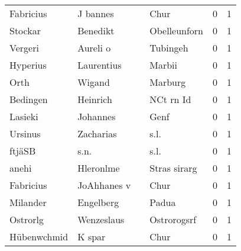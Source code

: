 \begin{center}
\begin{tiny}
\begin{longtabu}{llllrr}
                Fabricius &                           J bannes &             &                                        Chur &          0 &         1 \\
                  Stockar &                           Benedikt &             &                                Obelleunforn &          0 &         1 \\
                  Vergeri &                           Aureli o &             &                                    Tubingeh &          0 &         1 \\
                 Hyperius &                         Laurentius &             &                                      Marbii &          0 &         1 \\
                     Orth &                             Wigand &             &                                     Marburg &          0 &         1 \\
                 Bedingen &                           Heinrich &             &                                   NCt rn Id &          0 &         1 \\
                  Lasieki &                           Johannes &             &                                        Genf &          0 &         1 \\
                  Ursinus &                          Zacharias &             &                                        s.l. &          0 &         1 \\
                   ftjäSB &                               s.n. &             &                                        s.l. &          0 &         1 \\
                    anehi &                          Hleronlme &             &                                Stras sirarg &          0 &         1 \\
                Fabricius &                        JoAhhanes v &             &                                        Chur &          0 &         1 \\
                 Milander &                          Engelberg &             &                                       Padua &          0 &         1 \\
                 Ostrorlg &                         Wenzeslaus &             &                                 Ostrorogsrf &          0 &         1 \\
              Hübenwchmid &                             K spar &             &                                        Chur &          0 &         1 \\

\end{longtabu}
\end{tiny}
\end{center}
